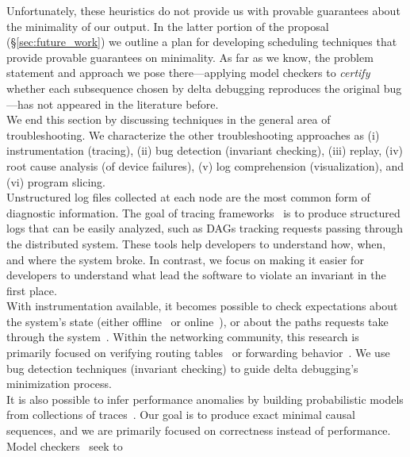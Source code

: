 Unfortunately, these heuristics do not provide us with provable guarantees
about the minimality of our output. In the latter portion of the
proposal (\S\ref{sec:future_work}) we outline a plan for
developing scheduling techniques that provide provable guarantees on
minimality. As far as we know, the problem statement and approach we pose there---applying model checkers
to {\em certify} whether each subsequence chosen by delta debugging reproduces
the original bug---has not appeared in the literature before.\\[0.5ex]
%
 We end this section by discussing
techniques in the general area of troubleshooting. We characterize the other troubleshooting approaches
as (i) instrumentation (tracing),
(ii) bug detection (invariant checking),
(iii) replay,
(iv) root cause analysis (of device failures), (v) log comprehension
(visualization), and (vi) program slicing.\\[0.5ex]
%
 Unstructured
log files collected at each node are the most common form of diagnostic information. The goal of
tracing frameworks~\cite{pip,fonseca2007x,Chen02pinpoint:problem,ndb14,barham2004using}
is to produce structured logs that can be easily analyzed, such as DAGs tracking
requests passing through the distributed system. These tools help developers to understand
how, when, and where the system broke. In contrast, we focus on making it
easier for developers to understand what lead the software
to violate an invariant in the first place.\\[0.5ex]
%
 With instrumentation available, it becomes possible
to check expectations about the
system's state (either offline~\cite{Liu07widschecker} or online~\cite{d3s}), or about the paths requests take through
the system~\cite{pip}. Within the networking community, this research is
primarily focused on verifying routing tables~\cite{hsa,hsa_realtime,anteater,khurshid2012veriflow}
or forwarding behavior~\cite{Zeng:2012:ATP:2413176.2413205,libra}.
We use bug detection techniques (invariant checking) to guide delta debugging's minimization
process.\\[0.5ex]
%
It is also possible to infer
performance anomalies by building probabilistic models from
collections of traces~\cite{barham2004using,Chen02pinpoint:problem}.
Our goal is to produce exact minimal causal sequences, and we are primarily focused on
correctness instead of performance.\\[0.5ex]
%
Model checkers~\cite{musuvathi2008finding,nice} seek to
